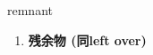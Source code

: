 
\begin{frame}
{\huge remnant}
\begin{center}
\begin{enumerate}\Large
  \item \textbf{残余物 (同left over)}
\end{enumerate}
\end{center}
\end{frame}
